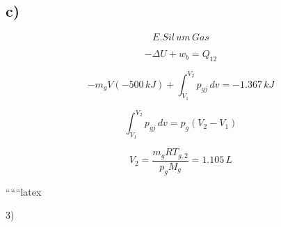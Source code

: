

\subsection*{c)}

\[
E.Sil \, um \, Gas
\]

\[
- \Delta U + w_b = Q_{12}
\]

\[
-m_g V (-500 \, kJ) + \int_{V_1}^{V_2} p_{gj} \, dv = -1.367 \, kJ
\]

\[
\int_{V_1}^{V_2} p_{gj} \, dv = p_g (V_2 - V_1)
\]

\[
V_2 = \frac{m_g R T_{g,2}}{p_g M_g} = 1.105 \, L
\]

``````latex


3)